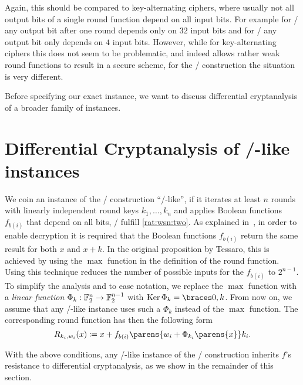 Again, this should be compared to key-alternating ciphers, where usually not all output bits of a single round function depend on all input bits.
For example for \AES/ any output bit after one round depends only on $32$ input bits and for \present/ any output bit only depends on $4$ input bits.
However, while for key-alternating ciphers this does not seem to be problematic, and indeed allows rather weak round functions to result in a secure scheme, for the \WSN/ construction the situation is very different.

Before specifying our exact instance, we want to discuss differential cryptanalysis of a broader family of instances.

\section{Differential Cryptanalysis of \bison/-like instances}\label{bison:sec:dc}
We coin an instance of the \WSN/ construction \enquote{\bison/-like}, if it iterates at least $n$ rounds with linearly independent round keys $k_1, \ldots, k_n$ and applies Boolean functions $f_{b(i)}$ that depend on all bits, \ie/ fulfill \cref{rat:wsn:two}.
As explained in~\cite[Section~3.1]{AC:Tessaro15}, in order to enable decryption it is required that the Boolean functions $f_{b(i)}$ return the same result for both $x$ and $x+k$.
In the original proposition by Tessaro, this is achieved by using the $\max$ function in the definition of the round function.
Using this technique reduces the number of possible inputs for the $f_{b(i)}$ to $2^{n-1}$.
To simplify the analysis and to ease notation, we replace the $\max$ function with a \emph{linear function} $\Phi_k : \mathbb{F}_2^n \to \mathbb{F}_2^{n-1}$ with $\Ker \Phi_k = \set{0,k}$.
From now on, we assume that any \bison/-like instance uses such a $\Phi_k$ instead of the $\max$ function.
The corresponding round function has then the following form
\begin{equation}
  R_{k_i, w_i}(x) \coloneqq x + f_{b(i)} \parens{w_i + \Phi_{k_i}\parens{x}} k_i.\label{bison:eqn:wsn_instance0}
\end{equation}

With the above conditions, any \bison/-like instance of the \WSN/ construction inherits $f$'s resistance to differential cryptanalysis, as we show in the remainder of this section.


